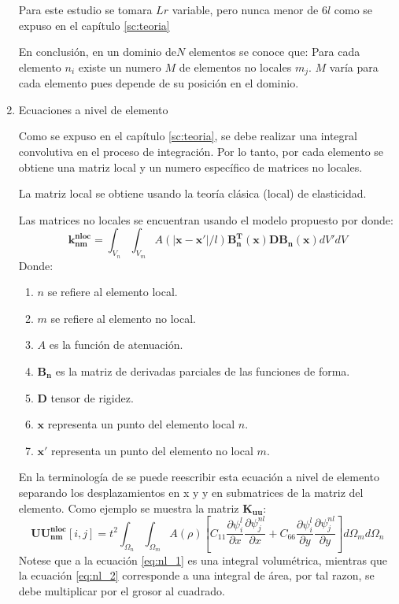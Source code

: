 \begin{enumerate}
				Para este estudio se tomara $Lr$ variable, pero nunca menor de $6l$ como se expuso en el capítulo \ref{sc:teoria}

				En conclusión, en un dominio de$N$ elementos se conoce que: Para cada elemento $n_i$ existe un numero $M$ de elementos no locales $m_j$. $M$ varía para cada elemento pues depende de su posición en el dominio.
				\item Ecuaciones a nivel de elemento

				Como se expuso en el capítulo \ref{sc:teoria}, se debe realizar una integral convolutiva en el proceso de integración. Por lo tanto, por cada elemento se obtiene una matriz local y un numero específico de matrices no locales.

				La matriz local se obtiene usando la teoría clásica (local) de elasticidad.

				Las matrices no locales se encuentran usando el modelo propuesto por \cite{Pisano2009} donde:
				\begin{equation}
					\boldsymbol{k_{nm}^{nloc}}=\int_{V_n}\int_{V_m}{A(|\boldsymbol{x}-\boldsymbol{x'}|/l)\boldsymbol{B_n^T}(\boldsymbol{x})\boldsymbol{D}\boldsymbol{B_n}(\boldsymbol{x})}{dV'}{dV}
					\label{eq:nl_1}
				\end{equation}
				Donde:
				\begin{enumerate}
					\item[] $n$ se refiere al elemento local.
					\item[] $m$ se refiere al elemento no local.
					\item[] $A$ es la función de atenuación.
					\item[] $\boldsymbol{B_n}$ es la matriz de derivadas parciales de las funciones de forma.
					\item[] $\boldsymbol{D}$ tensor de rigidez.
					\item[] $\boldsymbol{x}$ representa un punto del elemento local $n$.
					\item[] $\boldsymbol{x'}$ representa un punto del elemento no local $m$.
				\end{enumerate}
				En la terminología de \cite{Reddy} se puede reescribir esta ecuación a nivel de elemento separando los desplazamientos en x y y en submatrices de la matriz del elemento. Como ejemplo se muestra la matriz $\boldsymbol{K_{uu}}$:
				\begin{equation}
					\boldsymbol{UU_{nm}^{nloc}}[i,j]=t^2\int_{\Omega_n}\int_{\Omega_m}{A(\rho)\left[C_{11}\frac{\partial \psi_i^{l}}{\partial x}\frac{\partial \psi_j^{nl}}{\partial x}+C_{66}\frac{\partial \psi_i^{l}}{\partial y}\frac{\partial \psi_j^{nl}}{\partial y}\right]}{d\Omega_m}{d\Omega_n}
				\label{eq:nl_2}
				\end{equation}
				Notese que a la ecuación \ref{eq:nl_1} es una integral volumétrica, mientras que la ecuación \ref{eq:nl_2} corresponde a una integral de área, por tal razon, se debe multiplicar por el grosor al cuadrado.


\end{enumerate}

